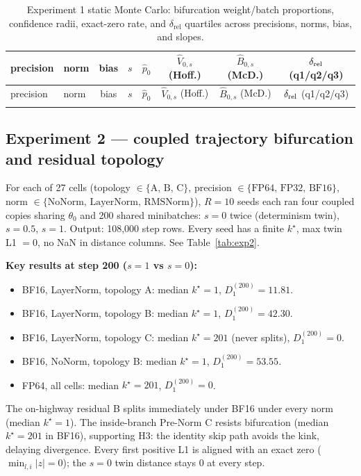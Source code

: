 \documentclass[11pt]{article}
\begin{document}
{\scriptsize
\begin{longtable}{l l c c c c c c}
\caption{Experiment 1 static Monte Carlo: bifurcation weight/batch proportions, confidence radii, exact-zero rate, and $\delta_{\mathrm{rel}}$ quartiles across precisions, norms, bias, and slopes.}\label{tab:exp1}\\
\toprule
precision & norm & bias & $s$ & $\hat p_0$ & $\hat V_{0,s}$ (Hoff.) & $\hat B_{0,s}$ (McD.) & $\delta_{\rm rel}$ (q1/q2/q3) \\
\midrule
\endfirsthead
\toprule
precision & norm & bias & $s$ & $\hat p_0$ & $\hat V_{0,s}$ (Hoff.) & $\hat B_{0,s}$ (McD.) & $\delta_{\rm rel}$ (q1/q2/q3) \\
\midrule
\endhead
\bottomrule
\endfoot

\end{longtable}}

\subsection{Experiment 2 --- coupled trajectory bifurcation and residual topology}\label{sec:exp2}
For each of 27 cells (topology $\in\{\text{A, B, C}\}$, precision $\in\{\text{FP64, FP32, BF16}\}$, norm $\in\{\text{NoNorm, LayerNorm, RMSNorm}\}$), $R=10$ seeds each ran four coupled copies sharing $\theta_0$ and 200 shared minibatches: $s=0$ twice (determinism twin), $s=0.5$, $s=1$. Output: 108,000 step rows. Every seed has a finite $k^\star$, max twin L1 $=0$, no NaN in distance columns. See Table~\ref{tab:exp2}.

\textbf{Key results at step 200 ($s=1$ vs $s=0$):}
\begin{itemize}
\item BF16, LayerNorm, topology A: median $k^\star=1$, $D_1^{(200)}=11.81$.
\item BF16, LayerNorm, topology B: median $k^\star=1$, $D_1^{(200)}=42.30$.
\item BF16, LayerNorm, topology C: median $k^\star=201$ (never splits), $D_1^{(200)}=0$.
\item BF16, NoNorm, topology B: median $k^\star=1$, $D_1^{(200)}=53.55$.
\item FP64, all cells: median $k^\star=201$, $D_1^{(200)}=0$.
\end{itemize}
The on-highway residual B splits immediately under BF16 under every norm (median $k^\star=1$). The inside-branch Pre-Norm C resists bifurcation (median $k^\star=201$ in BF16), supporting H3: the identity skip path avoids the kink, delaying divergence. Every first positive L1 is aligned with an exact zero ($\min_{l,i}|z|=0$); the $s=0$ twin distance stays $0$ at every step.
\end{document}
